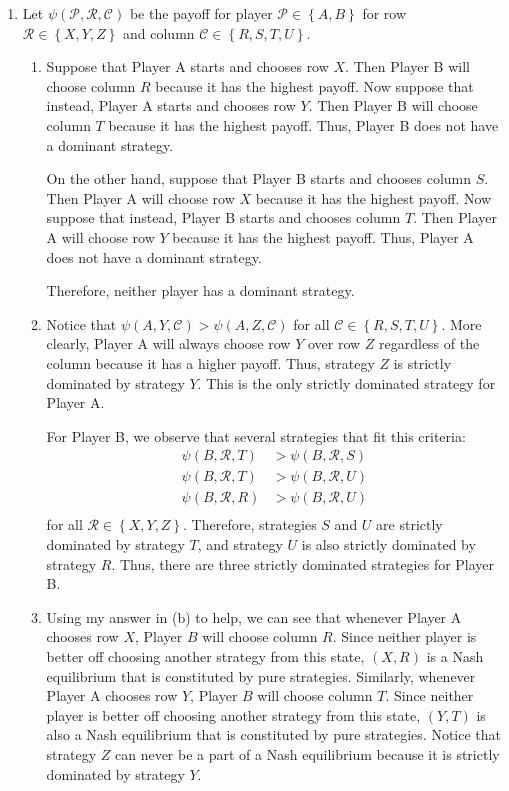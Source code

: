 \documentclass{article}
\newcommand{\pay}[3]{\psi\left(#1,#2,#3\right)}
\begin{document}
\begin{enumerate}
    \item Let $\pay{\mathcal{P}}{\mathcal{R}}{\mathcal{C}}$ be the payoff for player $\mathcal{P}\in\left\{A,B\right\}$ for row $\mathcal{R}\in\left\{X,Y,Z\right\}$ and column $\mathcal{C}\in\left\{R,S,T,U\right\}$.
    \begin{enumerate}
        \item Suppose that Player A starts and chooses row $X$. Then Player B will choose column $R$ because it has the highest payoff. Now suppose that instead, Player A starts and chooses row $Y$. Then Player B will choose column $T$ because it has the highest payoff. Thus, Player B does not have a dominant strategy. 
        
        On the other hand, suppose that Player B starts and chooses column $S$. Then Player A will choose row $X$ because it has the highest payoff. Now suppose that instead, Player B starts and chooses column $T$. Then Player A will choose row $Y$ because it has the highest payoff. Thus, Player A does not have a dominant strategy.
        
        Therefore, neither player has a dominant strategy.

        \item Notice that $\pay{A}{Y}{\mathcal{C}}>\pay{A}{Z}{\mathcal{C}}$ for all $\mathcal{C}\in\left\{R,S,T,U\right\}$. More clearly, Player A will always choose row $Y$ over row $Z$ regardless of the column because it has a higher payoff. Thus, strategy $Z$ is strictly dominated by strategy $Y$. This is the only strictly dominated strategy for Player A.
        
        For Player B, we observe that several strategies that fit this criteria: 
        \begin{align*}
            \pay{B}{\mathcal{R}}{T} & >\pay{B}{\mathcal{R}}{S} \\
            \pay{B}{\mathcal{R}}{T} & >\pay{B}{\mathcal{R}}{U} \\
            \pay{B}{\mathcal{R}}{R} & >\pay{B}{\mathcal{R}}{U} \\
        \end{align*}
        for all $\mathcal{R}\in\left\{X,Y,Z\right\}$. Therefore, strategies $S$ and $U$ are strictly dominated by strategy $T$, and strategy $U$ is also strictly dominated by strategy $R$. Thus, there are three strictly dominated strategies for Player B.

        \item Using my answer in (b) to help, we can see that whenever Player A chooses row $X$, Player $B$ will choose column $R$. Since neither player is better off choosing another strategy from this state, $(X,R)$ is a Nash equilibrium that is constituted by pure strategies. Similarly, whenever Player A chooses row $Y$, Player $B$ will choose column $T$. Since neither player is better off choosing another strategy from this state, $(Y,T)$ is also a Nash equilibrium that is constituted by pure strategies. Notice that strategy $Z$ can never be a part of a Nash equilibrium because it is strictly dominated by strategy $Y$.
    \end{enumerate}


\end{enumerate}
\end{document}
